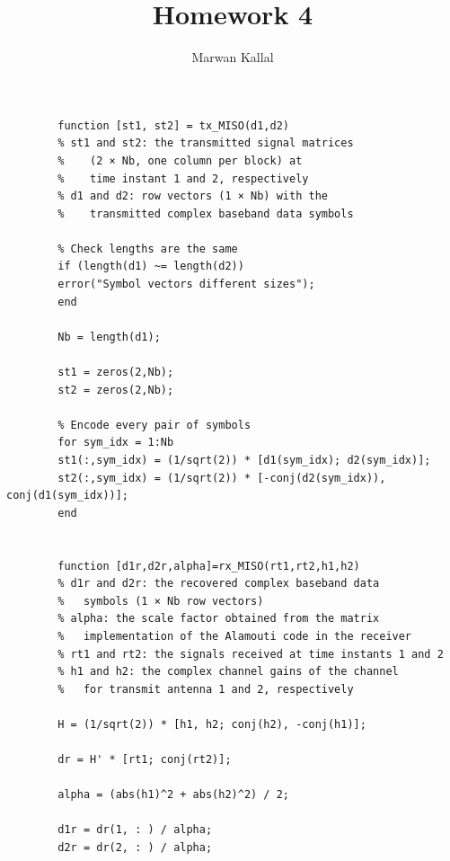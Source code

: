 \documentclass[]{article}
\title{Homework 4}
\author{Marwan Kallal}
\begin{document}
	
	\maketitle
	
	\section{}
	\begin{verbatim}
		function [st1, st2] = tx_MISO(d1,d2)
		% st1 and st2: the transmitted signal matrices 
		%    (2 × Nb, one column per block) at 
		%    time instant 1 and 2, respectively
		% d1 and d2: row vectors (1 × Nb) with the 
		%    transmitted complex baseband data symbols
		
		% Check lengths are the same
		if (length(d1) ~= length(d2))
		error("Symbol vectors different sizes");
		end
		
		Nb = length(d1);
		
		st1 = zeros(2,Nb);
		st2 = zeros(2,Nb);
		
		% Encode every pair of symbols
		for sym_idx = 1:Nb
		st1(:,sym_idx) = (1/sqrt(2)) * [d1(sym_idx); d2(sym_idx)];
		st2(:,sym_idx) = (1/sqrt(2)) * [-conj(d2(sym_idx)), conj(d1(sym_idx))];
		end
	\end{verbatim}
	
	\section{}
	\begin{verbatim}
		function [d1r,d2r,alpha]=rx_MISO(rt1,rt2,h1,h2)
		% d1r and d2r: the recovered complex baseband data 
		%   symbols (1 × Nb row vectors)
		% alpha: the scale factor obtained from the matrix 
		%   implementation of the Alamouti code in the receiver
		% rt1 and rt2: the signals received at time instants 1 and 2
		% h1 and h2: the complex channel gains of the channel 
		%   for transmit antenna 1 and 2, respectively
		
		H = (1/sqrt(2)) * [h1, h2; conj(h2), -conj(h1)];
		
		dr = H' * [rt1; conj(rt2)];
		
		alpha = (abs(h1)^2 + abs(h2)^2) / 2;
		
		d1r = dr(1, : ) / alpha;
		d2r = dr(2, : ) / alpha;
	\end{verbatim}
	
	\section{}
\end{document}
